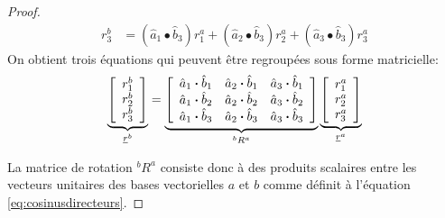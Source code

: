\begin{proof}
\begin{align}
r_3^b &= (\hat{a}_1 \bullet \hat{b}_3 ) r_1^a + (\hat{a}_2 \bullet \hat{b}_3 ) r_2^a + (\hat{a}_3 \bullet \hat{b}_3 ) r_3^a 
\end{align} 
On obtient trois équations qui peuvent être regroupées sous forme matricielle:
\begin{align}
\underbrace{ \left[ \begin{array}{c} r_1^b \\ r_2^b \\ r_3^b  \end{array} \right] }_{\underline{r}^b}
=
\underbrace{ \left[ \begin{array}{c c c} 
\hat{a}_1 \boldsymbol{\cdot} \hat{b}_1 & \hat{a}_2 \boldsymbol{\cdot} \hat{b}_1 & \hat{a}_3 \boldsymbol{\cdot} \hat{b}_1 \\
\hat{a}_1 \boldsymbol{\cdot} \hat{b}_2 & \hat{a}_2 \boldsymbol{\cdot} \hat{b}_2 & \hat{a}_3 \boldsymbol{\cdot} \hat{b}_2 \\
\hat{a}_1 \boldsymbol{\cdot} \hat{b}_3 & \hat{a}_2 \boldsymbol{\cdot} \hat{b}_3 & \hat{a}_3 \boldsymbol{\cdot} \hat{b}_3 
\end{array} \right] }_{^bR^a}
\underbrace{ \left[ \begin{array}{c} r_1^a \\ r_2^a \\ r_3^a  \end{array} \right] }_{\underline{r}^a}
\label{eq:Rdot}
\end{align} 

La matrice de rotation $^bR^a$ consiste donc à des produits scalaires entre les vecteurs unitaires des bases vectorielles $a$ et $b$ comme définit à l'équation \eqref{eq:cosinusdirecteurs}.
\end{proof}





